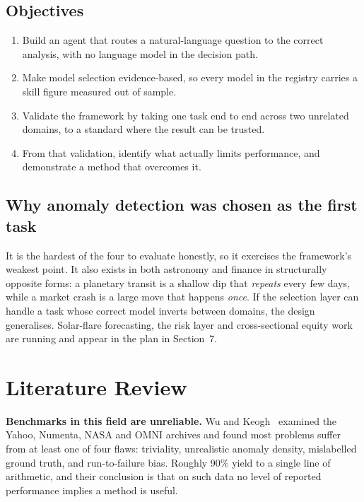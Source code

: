 \documentclass[11pt,a4paper]{article}
\begin{document}
\subsection*{Objectives}
\begin{enumerate}[label=\textbf{O\arabic*.}]
  \item Build an agent that routes a natural-language question to the correct
        analysis, with no language model in the decision path.
  \item Make model selection evidence-based, so every model in the registry
        carries a skill figure measured out of sample.
  \item Validate the framework by taking one task end to end across two
        unrelated domains, to a standard where the result can be trusted.
  \item From that validation, identify what actually limits performance, and
        demonstrate a method that overcomes it.
\end{enumerate}

\subsection*{Why anomaly detection was chosen as the first task}
It is the hardest of the four to evaluate honestly, so it exercises the
framework's weakest point. It also exists in both astronomy and finance in
structurally opposite forms: a planetary transit is a shallow dip that
\emph{repeats} every few days, while a market crash is a large move that
happens \emph{once}. If the selection layer can handle a task whose correct
model inverts between domains, the design generalises. Solar-flare forecasting,
the risk layer and cross-sectional equity work are running and appear in the
plan in Section~7.

\section{Literature Review}

\textbf{Benchmarks in this field are unreliable.} Wu and Keogh~\cite{wu2021}
examined the Yahoo, Numenta, NASA and OMNI archives and found most problems
suffer from at least one of four flaws: triviality, unrealistic anomaly
density, mislabelled ground truth, and run-to-failure bias. Roughly 90\% yield
to a single line of arithmetic, and their conclusion is that on such data no
level of reported performance implies a method is useful.
\end{document}
